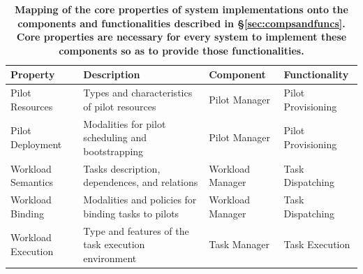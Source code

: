\documentclass{sig-alternate}
\begin{document}
\begin{table}
\centering
\begin{tabular}{p{3cm}p{7.7cm}p{2.7cm}p{2.6cm}}

\toprule

\textbf{Property} &
\textbf{Description} &
\textbf{Component} &
\textbf{Functionality} \\

\midrule

Pilot Resources &
Types and characteristics of pilot resources &
Pilot Manager &
Pilot Provisioning \\

Pilot Deployment &
Modalities for pilot scheduling and bootstrapping &
Pilot Manager &
Pilot Provisioning \\

Workload Semantics &
Tasks description, dependences, and relations &
Workload Manager &
Task Dispatching \\

Workload Binding&
Modalities and policies for binding tasks to pilots &
Workload Manager&
Task Dispatching \\

Workload Execution &
Type and features of the task execution environment &
Task Manager &
Task Execution \\

\bottomrule

\end{tabular}
\caption{\textbf{Mapping of the core properties  of \pilot system
  implementations onto the components and functionalities described in
  \S\ref{sec:compsandfuncs}. Core properties are necessary for every \pilot
  system to implement these components so as to provide those functionalities. }
  }
\label{table:core_properties}
\end{table}
\end{document}
